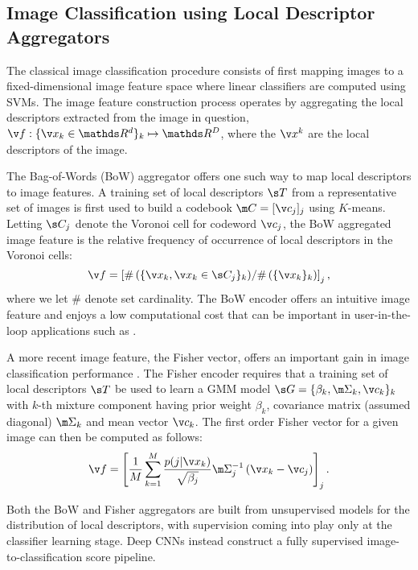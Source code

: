 \documentclass{article}
\begin{document}
\subsection{Image Classification using Local Descriptor Aggregators}
The classical image classification procedure consists of first mapping images to a fixed-dimensional image feature space where linear classifiers are computed using SVMs. The image feature construction process operates by aggregating the local descriptors extracted from the image in question, $\v f: \{\v x_k \in \mathds R^d\}_k \mapsto \mathds R^D$, where the $\v x^k$ are the local descriptors of the image.

The Bag-of-Words (BoW) aggregator offers one such way to map local descriptors to image features. A training set of local descriptors $\s T$ from a representative set of images is first used to build a codebook $\m C = [\v c_j]_j$ using $K$-means. Letting $\s C_j$ denote the Voronoi cell for codeword $\v c_j$, the BoW aggregated image feature is the relative frequency of occurrence of local descriptors in the Voronoi cells: 
\begin{equation}\label{eqn:BoW}
\v f = \left [ {\# \left ( \{\v x_k, \v x_k \in \s C_j\}_k \right )} / {\# \left (\{\v x_k\}_k \right )} \right ]_j,
\end{equation}
where we let $\#$ denote set cardinality. The BoW encoder offers an intuitive image feature and enjoys a low computational cost that can be important in user-in-the-loop applications such as \cite{Parkhi}. 

A more recent image feature, the Fisher vector, offers an important gain in image classification performance \cite{Chatfield2011}. The Fisher encoder requires that a training set of local descriptors $\s T$ be used to learn a GMM model $\s G=\{\beta_k,\m \Sigma_k, \v c_k\}_k$ with $k$-th mixture component having prior weight $\beta_k$, covariance matrix (assumed diagonal) $\m \Sigma_k$ and mean vector $\v c_k$. The first order Fisher vector for a given image can then be computed as follows:
\begin{equation}
\label{eqn:Fisher}
\v f = \left [ \frac{1}{M}\sum_{k=1}^M \frac{p(j|\v x_k)}{\sqrt{\beta_j}} \m \Sigma_j^{-1} \left ( \v x_k - \v c_j \right ) \right ]_j.
\end{equation}


Both the BoW and Fisher aggregators are built from unsupervised models for the distribution of local descriptors, with supervision coming into play only at the classifier learning stage. Deep CNNs instead construct a fully supervised image-to-classification score pipeline.
\end{document}
